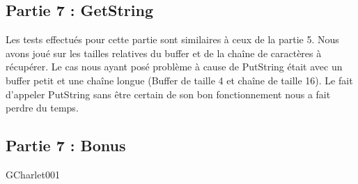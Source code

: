 \documentclass[a4paper]{article}
\begin{document}
\subsection{Partie 7 : GetString}

Les tests effectués pour cette partie sont similaires à ceux de la partie 5. Nous
avons joué sur les tailles relatives du buffer et de la chaîne de caractères à
récupérer. Le cas nous ayant posé problème à cause de PutString était avec un buffer
petit et une chaîne longue (Buffer de taille 4 et chaîne de taille 16). Le fait
d'appeler PutString sans être certain de son bon fonctionnement nous a fait perdre
du temps.

\subsection{Partie 7 : Bonus}

GCharlet001

\end{document}
